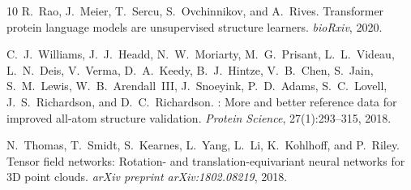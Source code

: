 \documentclass{article}
\begin{document}
\begin{thebibliography}{10}
R.~Rao, J.~Meier, T.~Sercu, S.~Ovchinnikov, and A.~Rives.
\newblock Transformer protein language models are unsupervised structure learners.
\newblock \emph{bioRxiv}, 2020.

C.~J.~Williams, J.~J.~Headd, N.~W.~Moriarty, M.~G.~Prisant, L.~L.~Videau, L.~N.~Deis, V.~Verma, D.~A.~Keedy, B.~J.~Hintze, V.~B.~Chen, S.~Jain, S.~M.~Lewis, W.~B.~Arendall~III, J.~Snoeyink, P.~D.~Adams, S.~C.~Lovell, J.~S.~Richardson, and D.~C.~Richardson.
: More and better reference data for improved all-atom structure validation.
\newblock \emph{Protein Science}, 27(1):293--315, 2018.

N.~Thomas, T.~Smidt, S.~Kearnes, L.~Yang, L.~Li, K.~Kohlhoff, and P.~Riley.
\newblock Tensor field networks: Rotation- and translation-equivariant neural networks for {3D} point clouds.
\newblock \emph{arXiv preprint arXiv:1802.08219}, 2018.

\end{thebibliography}
\end{document}
